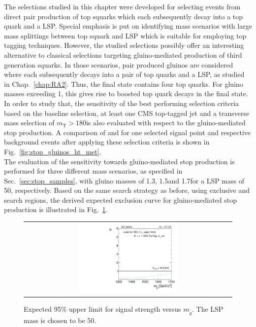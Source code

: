 The selections studied in this chapter were developed for selecting events from direct pair production of top squarks which each subsequently decay into a top quark and a LSP. Special emphasis is put on identifying mass scenarios with large mass splittings between top squark and LSP which is suitable for employing top tagging techniques. However, the studied selections possibly offer an interesting alternative to classical selections targeting gluino-mediated production of third generation squarks. In those scenarios, pair produced gluinos are considered where each subsequently decays into a pair of top quarks and a LSP, as studied in Chap.~\ref{chap:RA2}. Thus, the final state contains four top quarks. For gluino masses exceeding 1\tev, this gives rise to boosted top quark decays in the final state. In order to study that, the sensitivity of the best performing selection criteria based on the baseline selection, at least one CMS top-tagged jet and a transverse mass selection of $m_\mathrm{T} > 180$\gev is also evaluated with respect to the gluino-mediated stop production. A comparison of \HT and \met for one selected signal point and respective background events after applying these selection criteria is shown in Fig.~\ref{fig:stop_gluinos_ht_met}. \\
The evaluation of the sensitivity towards gluino-mediated stop production is performed for three different mass scenarios, as specified in Sec.~\ref{sec:stop_samples}, with gluino masses of 1.3\tev, 1.5\tev and 1.7\tev for a LSP mass of 50\gev, respectively. Based on the same search strategy as before, using exclusive \HT and \met search regions, the derived expected exclusion curve for gluino-mediated stop production is illustrated in Fig.~\ref{fig:stop_gluino_mediated_limit}. 
\begin{figure}[!t]
  \centering
  \begin{tabular}{c}
                \includegraphics[width=0.49\textwidth]{figures/limitplot4BinSel_T1tttt.pdf} 
  \end{tabular}
  \caption{Expected 95\% upper limit for signal strength versus $m_{\tilde{g}}$. The LSP mass is chosen to be 50\gev.}
  \label{fig:stop_gluino_mediated_limit}
\end{figure}
